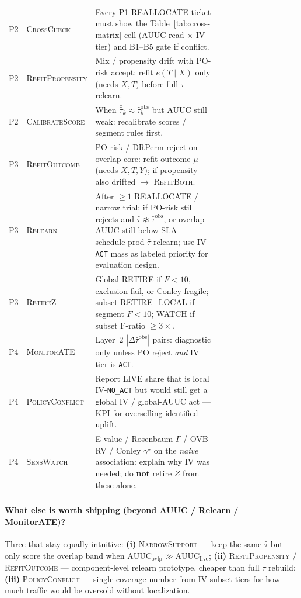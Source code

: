 \begin{center}
\begin{tabular}{@{}clp{0.72\linewidth}@{}}
P2 & \textsc{CrossCheck} &
Every P1 REALLOCATE ticket must show the Table~\ref{tab:cross-matrix} cell (AUUC read $\times$ IV tier) and B1--B5 gate if conflict. \\
P2 & \textsc{RefitPropensity} &
Mix / propensity drift with PO-risk accept: refit $e(T\mid X)$ only (needs $X,T$) before full $\tau$ relearn. \\
P2 & \textsc{CalibrateScore} &
When $\bar{\hat\tau}_k\approx\widehat{\tau}^{\mathrm{obs}}_k$ but AUUC still weak: recalibrate scores / segment rules first. \\
P3 & \textsc{RefitOutcome} &
PO-risk / DRPerm reject on overlap core: refit outcome $\mu$ (needs $X,T,Y$); if propensity also drifted $\to$ \textsc{RefitBoth}. \\
P3 & \textsc{Relearn} &
After $\ge 1$ REALLOCATE / narrow trial: if PO-risk still rejects and $\bar{\hat\tau}\not\approx\widehat{\tau}^{\mathrm{obs}}$, or overlap AUUC still below SLA --- schedule prod $\hat\tau$ relearn; use IV-\texttt{ACT} mass as labeled priority for evaluation design. \\
P3 & \textsc{RetireZ} &
Global RETIRE if $F<10$, exclusion fail, or Conley fragile; subset RETIRE\_LOCAL if segment $F<10$; WATCH if subset F-ratio $\ge 3\times$. \\
P4 & \textsc{MonitorATE} &
Layer~2 $|\Delta\widehat{\tau}^{\mathrm{obs}}|$ pairs: diagnostic only unless PO reject \emph{and} IV tier is \texttt{ACT}. \\
P4 & \textsc{PolicyConflict} &
Report LIVE share that is local IV-\texttt{NO\_ACT} but would still get a global IV / global-AUUC act --- KPI for overselling identified uplift. \\
P4 & \textsc{SensWatch} &
E-value / Rosenbaum $\Gamma$ / OVB RV / Conley $\gamma^\star$ on the \emph{naive} association: explain why IV was needed; do \textbf{not} retire $Z$ from these alone. \\
\bottomrule
\end{tabular}
\end{center}

\paragraph{What else is worth shipping (beyond AUUC / Relearn / MonitorATE)?}
Three that stay equally intuitive:
\textbf{(i)} \textsc{NarrowSupport} --- keep the same $\hat\tau$ but only score the overlap band when $\mathrm{AUUC}_{\mathrm{ovlp}}\gg\mathrm{AUUC}_{\mathrm{live}}$;
\textbf{(ii)} \textsc{RefitPropensity} / \textsc{RefitOutcome} --- component-level relearn prototype, cheaper than full $\tau$ rebuild;
\textbf{(iii)} \textsc{PolicyConflict} --- single coverage number from IV subset tiers for how much traffic would be oversold without localization.

